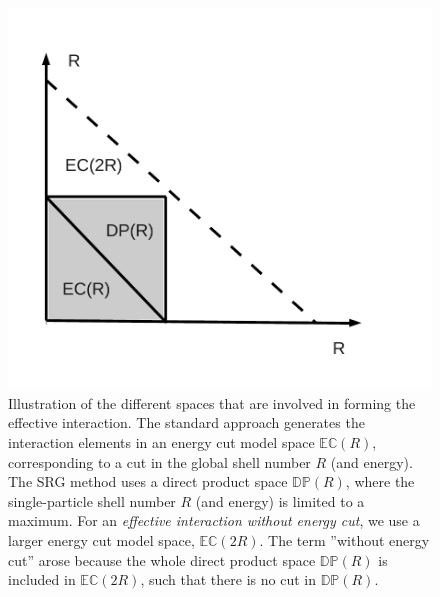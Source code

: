 \begin{figure}
\begin{center}
\includegraphics[scale=0.4]{../Plots/EffInt1.pdf}
\caption{Illustration of the different spaces that are involved in forming the effective interaction. The standard approach generates the interaction elements in an energy cut model space $\mathbb{EC}(R)$, corresponding to a cut in the global shell number $R$ (and energy). The SRG method uses a direct product space $\mathbb{DP}(R)$, where the single-particle shell number $R$ (and energy) is limited to a maximum. For an \textit{effective interaction without energy cut}, we use a larger energy cut model space, $\mathbb{EC}(2R)$. The term ''without energy cut'' arose because the whole direct product space $\mathbb{DP}(R)$ is included in $\mathbb{EC}(2R)$, such that there is no cut in $\mathbb{DP}(R)$.}
\label{fig:EffInt}
\end{center}
\end{figure}

